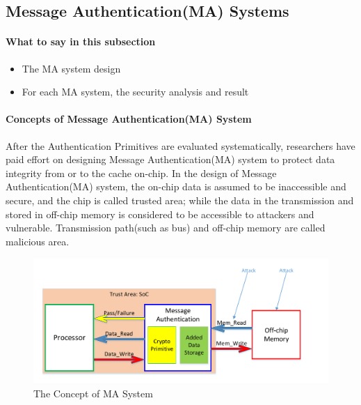 \documentclass{article}
\begin{document}
\subsection{Message Authentication(MA) Systems}
\paragraph{What to say in this subsection}
\begin{itemize}
	\item The MA system design
	\item For each MA system, the security analysis and result
\end{itemize}

\paragraph{Concepts of Message Authentication(MA) System}
After the Authentication Primitives are evaluated systematically, researchers have paid effort on designing Message Authentication(MA) system to protect data integrity from or to the cache on-chip. 
In the design of Message Authentication(MA) system, the on-chip data is assumed to be inaccessible and secure, and the chip is called trusted area; while the data in the transmission and stored in off-chip memory is considered to be accessible to attackers and vulnerable. Transmission path(such as bus) and off-chip memory are called malicious area. 
\begin{figure}[htbp]
\centering
\includegraphics[scale=0.5]{./diagrams/MA_concept.pdf}
\caption{The Concept of MA System}
\label{ma_system}
\end{figure}
\end{document}
